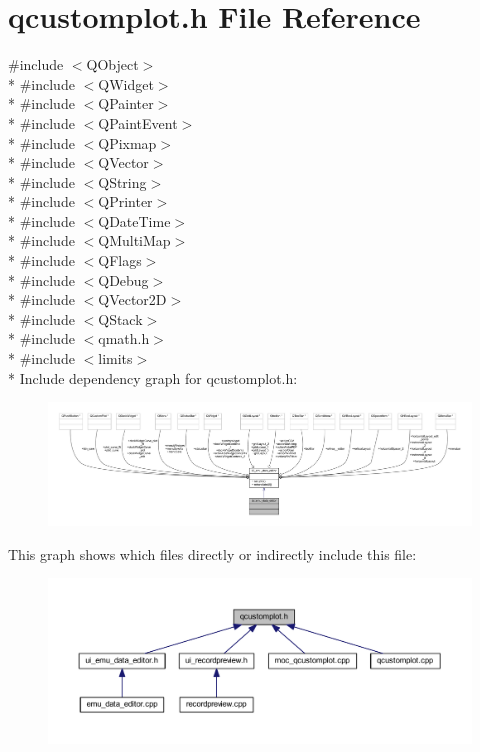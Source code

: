 \hypertarget{a00116}{\section{qcustomplot.\+h File Reference}
\label{a00116}
}
{\ttfamily \#include $<$Q\+Object$>$}\\*
{\ttfamily \#include $<$Q\+Widget$>$}\\*
{\ttfamily \#include $<$Q\+Painter$>$}\\*
{\ttfamily \#include $<$Q\+Paint\+Event$>$}\\*
{\ttfamily \#include $<$Q\+Pixmap$>$}\\*
{\ttfamily \#include $<$Q\+Vector$>$}\\*
{\ttfamily \#include $<$Q\+String$>$}\\*
{\ttfamily \#include $<$Q\+Printer$>$}\\*
{\ttfamily \#include $<$Q\+Date\+Time$>$}\\*
{\ttfamily \#include $<$Q\+Multi\+Map$>$}\\*
{\ttfamily \#include $<$Q\+Flags$>$}\\*
{\ttfamily \#include $<$Q\+Debug$>$}\\*
{\ttfamily \#include $<$Q\+Vector2\+D$>$}\\*
{\ttfamily \#include $<$Q\+Stack$>$}\\*
{\ttfamily \#include $<$qmath.\+h$>$}\\*
{\ttfamily \#include $<$limits$>$}\\*
Include dependency graph for qcustomplot.\+h\+:
\nopagebreak
\begin{figure}[H]
\begin{center}
\leavevmode
\includegraphics[width=350pt]{d4/d8f/a00324}
\end{center}
\end{figure}
This graph shows which files directly or indirectly include this file\+:
\nopagebreak
\begin{figure}[H]
\begin{center}
\leavevmode
\includegraphics[width=350pt]{de/dc8/a00325}
\end{center}
\end{figure}
